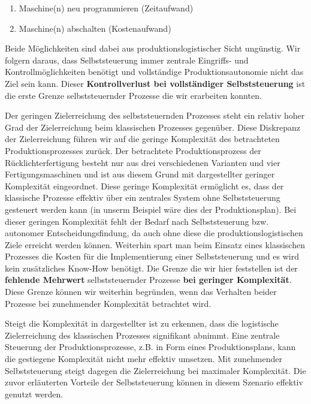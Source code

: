 \begin{enumerate}
  \item Maschine(n) neu programmieren (Zeitaufwand)
  \item Maschine(n) abschalten (Kostenaufwand)
\end{enumerate}

Beide Möglichkeiten sind dabei aus produktionslogistischer Sicht ungünstig.
Wir folgern daraus, dass Selbststeuerung immer zentrale Eingriffs- und Kontrollmöglichkeiten
benötigt und vollständige Produktionsautonomie nicht das Ziel sein kann. Dieser \textbf{Kontrollverlust
bei vollständiger Selbststeuerung} ist die erste Grenze selbststeuernder Prozesse
die wir erarbeiten konnten.

Der geringen Zielerreichung des selbststeuernden Prozesses steht ein relativ
hoher Grad der Zielerreichung beim klassischen Prozesses gegenüber.
Diese Diskrepanz der Zielerreichung führen wir auf die geringe
Komplexität des betrachteten Produktionsprozesses zurück.
Der betrachtete Produktionsprozess der Rücklichterfertigung besteht nur aus
drei verschiedenen Varianten und vier Fertigungsmaschinen und ist aus diesem
Grund mit dargestellter geringer Komplexität eingeordnet. Diese geringe
Komplexität ermöglicht es, dass der klassische Prozesse effektiv über ein zentrales
System ohne Selbststeuerung gesteuert werden kann (in unserm Beispiel wäre dies der Produktionsplan).
Bei dieser geringen Komplexität fehlt der Bedarf nach Selbststeuerung bzw. autonomer Entscheidungsfindung,
da auch ohne diese die produktionslogistischen Ziele erreicht werden können.
Weiterhin spart man beim Einsatz eines klassischen Prozesses die Kosten für 
die Implementierung einer Selbststeuerung und es wird kein zusätzliches 
Know-How benötigt. Die Grenze die wir hier feststellen ist der \textbf{fehlende Mehrwert}
selbststeuernder Prozesse \textbf{bei geringer Komplexität}.
Diese Grenze können wir weiterhin begründen, wenn das Verhalten beider Prozesse
bei zunehmender Komplexität betrachtet wird.

Steigt die Komplexität in dargestellter  ist zu erkennen,
dass die logistische Zielerreichung des klassischen Prozesses signifikant abnimmt.
Eine zentrale Steuerung der Produktionsprozesse, z.B. in Form eines Produktionsplans,
kann die gestiegene Komplexität nicht mehr effektiv umsetzen. Mit zunehmender 
Selbststeuerung steigt dagegen die Zielerreichung bei maximaler Komplexität. Die 
zuvor erläuterten Vorteile der Selbststeuerung können in diesem Szenario effektiv
genutzt werden.

